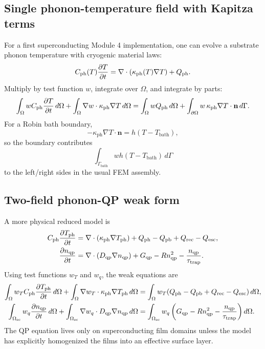 \documentclass[11pt]{article}
\newcommand{\Tbath}{T_{\mathrm{bath}}}
\newcommand{\nqp}{n_{\mathrm{qp}}}
\newcommand{\tautrap}{\tau_{\mathrm{trap}}}
\newcommand{\nvecb}{\mathbf{n}}
\begin{document}
\subsection{Single phonon-temperature field with Kapitza terms}

For a first superconducting Module 4 implementation, one can evolve a substrate phonon temperature with cryogenic material laws:
\begin{equation}
C_{\mathrm{ph}}(T)\pdv{T}{t}
=\nabla\cdot(\kappa_{\mathrm{ph}}(T)\nabla T)+Q_{\mathrm{ph}}.
\label{eq:first_sc_phonon_pde}
\end{equation}
Multiply by test function \(w\), integrate over \(\Omega\), and integrate by parts:
\begin{equation}
\int_\Omega w C_{\mathrm{ph}}\pdv{T}{t}\,d\Omega
+\int_\Omega \nabla w\cdot \kappa_{\mathrm{ph}}\nabla T\,d\Omega
=\int_\Omega w Q_{\mathrm{ph}}\,d\Omega
+\int_{\partial\Omega}w\,\kappa_{\mathrm{ph}}\nabla T\cdot\nvecb\,d\Gamma.
\label{eq:weak_phonon}
\end{equation}
For a Robin bath boundary,
\begin{equation}
-\kappa_{\mathrm{ph}}\nabla T\cdot\nvecb=h(T-\Tbath),
\end{equation}
so the boundary contributes
\begin{equation}
\int_{\Gamma_{\mathrm{bath}}} w h (T-\Tbath)\,d\Gamma
\end{equation}
to the left/right sides in the usual FEM assembly.

\subsection{Two-field phonon-QP weak form}

A more physical reduced model is
\begin{align}
C_{\mathrm{ph}}\pdv{T_{\mathrm{ph}}}{t}
&=\nabla\cdot(\kappa_{\mathrm{ph}}\nabla T_{\mathrm{ph}})+Q_{\mathrm{ph}}-Q_{\mathrm{pb}}+Q_{\mathrm{rec}}-Q_{\mathrm{esc}},\\
\pdv{\nqp}{t}
&=\nabla\cdot(D_{\mathrm{qp}}\nabla\nqp)+G_{\mathrm{qp}}-R\nqp^2-\frac{\nqp}{\tautrap}.
\end{align}
Using test functions \(w_T\) and \(w_q\), the weak equations are
\begin{align}
\int_\Omega w_T C_{\mathrm{ph}}\pdv{T_{\mathrm{ph}}}{t}\,d\Omega
+\int_\Omega \nabla w_T\cdot\kappa_{\mathrm{ph}}\nabla T_{\mathrm{ph}}\,d\Omega
&=\int_\Omega w_T(Q_{\mathrm{ph}}-Q_{\mathrm{pb}}+Q_{\mathrm{rec}}-Q_{\mathrm{esc}})\,d\Omega,
\label{eq:weak_Tph}\\
\int_{\Omega_{\mathrm{sc}}} w_q\pdv{\nqp}{t}\,d\Omega
+\int_{\Omega_{\mathrm{sc}}}\nabla w_q\cdot D_{\mathrm{qp}}\nabla\nqp\,d\Omega
&=\int_{\Omega_{\mathrm{sc}}}w_q\left(G_{\mathrm{qp}}-R\nqp^2-\frac{\nqp}{\tautrap}\right)d\Omega.
\label{eq:weak_qp}
\end{align}
The QP equation lives only on superconducting film domains unless the model has explicitly homogenized the films into an effective surface layer.
\end{document}
